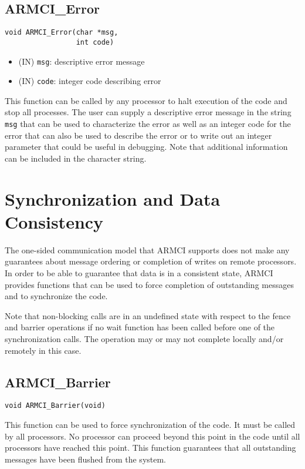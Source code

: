 \documentclass[12pt]{article}
\begin{document}
\subsection{ARMCI\_Error}
\begin{verbatim}
void ARMCI_Error(char *msg,
                 int code)
\end{verbatim}
\begin{itemize}
\item (IN) \texttt{msg}: descriptive error message
\item (IN) \texttt{code}: integer code describing error
\end{itemize}
This function can be called by any processor to halt execution of the code and
stop all processes. The user can supply a descriptive error message in the
string \texttt{msg} that can be used to characterize the error as well as an
integer code for the error that can also be used to describe the error or to
write out an integer parameter that could be useful in debugging. Note that
additional information can be included in the character string.

\section{Synchronization and Data Consistency}
The one-sided communication model that ARMCI supports does not make any guarantees
about message ordering or completion of writes on remote processors. In order to
be able to guarantee that data is in a consistent state, ARMCI provides functions
that can be used to force completion of outstanding messages and to synchronize
the code.

Note that non-blocking calls are in an undefined state with respect to the fence
and barrier operations if no wait function has been called before one of the
synchronization calls. The operation may or may not complete locally and/or
remotely in this case.

\subsection{ARMCI\_Barrier}
\begin{verbatim}
void ARMCI_Barrier(void)
\end{verbatim}
This function can be used to force synchronization of the code. It must be
called by all processors. No processor can proceed beyond this point in the code
until all processors have reached this point. This function guarantees that all
outstanding messages have been flushed from the system.
\end{document}
